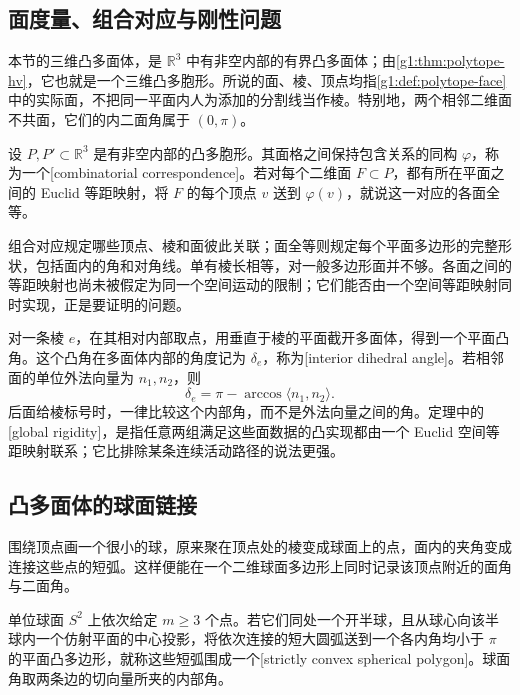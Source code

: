 \subsection{面度量、组合对应与刚性问题}
\label{g1:subsec:E04:01}

本节的三维凸多面体，是 \(\mathbb R^3\) 中有非空内部的有界凸多面体；由\cref{g1:thm:polytope-hv}，它也就是一个三维凸多胞形。所说的面、棱、顶点均指\cref{g1:def:polytope-face}中的实际面，不把同一平面内人为添加的分割线当作棱。特别地，两个相邻二维面不共面，它们的内二面角属于 \((0,\pi)\)。

\begin{definition}\label{g1:def:cauchy-face-data}
	设 \(P,P'\subset\mathbb R^3\) 是有非空内部的凸多胞形。其面格之间保持包含关系的同构 \(\varphi\)，称为一个[combinatorial correspondence]。若对每个二维面 \(F\subset P\)，都有所在平面之间的 Euclid 等距映射，将 \(F\) 的每个顶点 \(v\) 送到 \(\varphi(v)\)，就说这一对应的各面全等。
\end{definition}

组合对应规定哪些顶点、棱和面彼此关联；面全等则规定每个平面多边形的完整形状，包括面内的角和对角线。单有棱长相等，对一般多边形面并不够。各面之间的等距映射也尚未被假定为同一个空间运动的限制；它们能否由一个空间等距映射同时实现，正是要证明的问题。

\ProseParagraphBreak

对一条棱 \(e\)，在其相对内部取点，用垂直于棱的平面截开多面体，得到一个平面凸角。这个凸角在多面体内部的角度记为 \(\delta_e\)，称为[interior dihedral angle]。若相邻面的单位外法向量为 \(n_1,n_2\)，则
\begin{equation}\label{g1:eq:interior-dihedral-normal-angle}
	\delta_e=\pi-\arccos\langle n_1,n_2\rangle.
\end{equation}
后面给棱标号时，一律比较这个内部角，而不是外法向量之间的角。定理中的[global rigidity]，是指任意两组满足这些面数据的凸实现都由一个 Euclid 空间等距映射联系；它比排除某条连续活动路径的说法更强。

\subsection{凸多面体的球面链接}
\label{g1:subsec:E04:02}

围绕顶点画一个很小的球，原来聚在顶点处的棱变成球面上的点，面内的夹角变成连接这些点的短弧。这样便能在一个二维球面多边形上同时记录该顶点附近的面角与二面角。

\begin{definition}\label{g1:def:cauchy-spherical-polygon}
	单位球面 \(S^2\) 上依次给定 \(m\ge3\) 个点。若它们同处一个开半球，且从球心向该半球内一个仿射平面的中心投影，将依次连接的短大圆弧送到一个各内角均小于 \(\pi\) 的平面凸多边形，就称这些短弧围成一个[strictly convex spherical polygon]。球面角取两条边的切向量所夹的内部角。
\end{definition}

